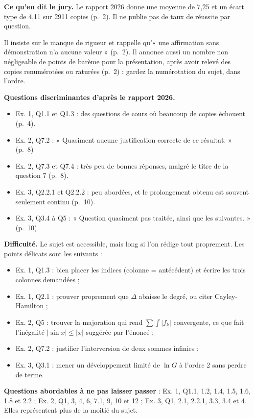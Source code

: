 \documentclass[11pt,a4paper]{article}
\providecommand{\tightlist}{\setlength{\itemsep}{0pt}\setlength{\parskip}{0pt}}
\begin{document}
\textbf{Ce qu'en dit le jury.} Le rapport 2026 donne une moyenne de 7,25 et un écart type de 4,11 sur 2911 copies (p.~2). Il ne publie pas de taux de réussite par question.

Il insiste sur le manque de rigueur et rappelle qu'« une affirmation sans démonstration n'a aucune valeur » (p.~2). Il annonce aussi un nombre non négligeable de points de barème pour la présentation, après avoir relevé des copies renumérotées ou raturées (p.~2) : gardez la numérotation du sujet, dans l'ordre.

\textbf{Questions discriminantes d'après le rapport 2026.}

\begin{itemize}
\tightlist
\item
  Ex. 1, Q1.1 et Q1.3 : des questions de cours où beaucoup de copies échouent (p.~4).
\item
  Ex. 2, Q7.2 : « Quasiment aucune justification correcte de ce résultat. » (p.~8)
\item
  Ex. 2, Q7.3 et Q7.4 : très peu de bonnes réponses, malgré le titre de la question 7 (p.~8).
\item
  Ex. 3, Q2.2.1 et Q2.2.2 : peu abordées, et le prolongement obtenu est souvent seulement continu (p.~10).
\item
  Ex. 3, Q3.4 à Q5 : « Question quasiment pas traitée, ainsi que les suivantes. » (p.~10)
\end{itemize}

\textbf{Difficulté.} Le sujet est accessible, mais long si l'on rédige tout proprement. Les points délicats sont les suivants :

\begin{itemize}
\tightlist
\item
  Ex. 1, Q1.3 : bien placer les indices (colonne = antécédent) et écrire les trois colonnes demandées ;
\item
  Ex. 1, Q2.1 : prouver proprement que \(\Delta\) abaisse le degré, ou citer Cayley-Hamilton ;
\item
  Ex. 2, Q5 : trouver la majoration qui rend \(\sum\int|f_k|\) convergente, ce que fait l'inégalité \(|\sin x|\le|x|\) suggérée par l'énoncé ;
\item
  Ex. 2, Q7.2 : justifier l'interversion de deux sommes infinies ;
\item
  Ex. 3, Q3.1 : mener un développement limité de \(\ln G\) à l'ordre 2 sans perdre de terme.
\end{itemize}

\textbf{Questions abordables à ne pas laisser passer} : Ex. 1, Q1.1, 1.2, 1.4, 1.5, 1.6, 1.8 et 2.2 ; Ex. 2, Q1, 3, 4, 6, 7.1, 9, 10 et 12 ; Ex. 3, Q1, 2.1, 2.2.1, 3.3, 3.4 et 4. Elles représentent plus de la moitié du sujet.
\end{document}
